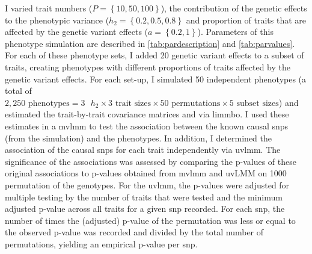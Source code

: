 I varied trait numbers (\(P=\left\{10,50,100\right\}\)), the contribution of the genetic effects  to the phenotypic variance (\(h_2=\left\{0.2,0.5,0.8\right\}\) and proportion of traits that are affected by the genetic variant effects (\(a=\left\{0.2, 1\right\}\)). Parameters of this phenotype simulation are described in \cref{tab:pardescription} and \cref{tab:parvalues}. For each of these phenotype sets, I added \num{20} genetic variant effects to a subset of traits, creating phenotypes with different proportions of traits affected by the genetic variant effects.  For each set-up, I simulated \num{50} independent phenotypes (a total of \( 2,250 \text{ phenotypes} = 3\text{ }h_2 \times 3 \text{ trait sizes} \times 50 \text{ permutations} \times 5 \text{ subset sizes}\)) and estimated the trait-by-trait covariance matrices  and  via \gls{limmbo}. I used these estimates in a \gls{mvlmm} to test the association between the known causal \glspl{snp} (from the simulation) and the phenotypes. In addition, I determined the association of the causal \glspl{snp} for each trait independently via \gls{uvlmm}. The significance of the associations was assessed by comparing the p-values of these original associations to p-values obtained from \gls{mvlmm} and uvLMM on \num{1000} permutation of the genotypes.  For the \gls{uvlmm}, the p-values were adjusted for multiple testing by the number of traits that were tested and the minimum adjusted p-value across all traits for a given \gls{snp} recorded. For each \gls{snp}, the number of times the (adjusted) p-value of the permutation was less or equal to the observed p-value was recorded and divided by the total number of permutations, yielding an empirical p-value per \gls{snp}.

